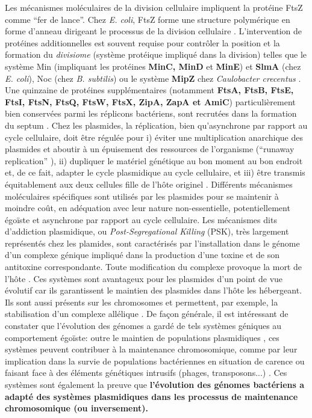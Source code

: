 	Les mécanismes moléculaires de la division cellulaire impliquent la protéine FtsZ comme “fer de lance”. Chez \textit{E. coli}, FtsZ forme une structure polymérique en forme d'anneau dirigeant le processus de la division cellulaire \citep{thanbichler2010}. L'intervention de protéines additionnelles est souvent requise pour contrôler la position et la formation du \textit{divisiome} (système protéique impliqué dans la division) telles que le système Min (impliquant les protéines \textbf{MinC, MinD} et \textbf{MinE}) et \textbf{SlmA} (chez \textit{E. coli}), Noc (chez \textit{B. subtilis}) ou le système \textbf{MipZ} chez \textit{Caulobacter crecentus} \citep{thanbichler2010synchronization}. Une quinzaine de protéines supplémentaires (notamment \textbf{FtsA, FtsB, FtsE, FtsI, FtsN, FtsQ, FtsW, FtsX, ZipA, ZapA et AmiC}) particulièrement bien conservées parmi les réplicons bactériens, sont recrutées dans la formation du septum \citep{vicente2006septum}. Chez les plasmides, la réplication, bien qu'asynchrone par rapport au cycle cellulaire, doit être régulée pour i) éviter une multiplication anarchique des plasmides et aboutir à un épuisement des ressources de l'organisme (“runaway replication” \citep{DelSolar1998}), ii) dupliquer le matériel génétique au bon moment au bon endroit et, de ce fait, adapter le cycle plasmidique au cycle cellulaire, et iii) être transmis équitablement aux deux cellules fille de l'hôte originel \citep{Pinto2012}. Différents mécanismes moléculaires spécifiques sont utilisés par les plasmides pour se maintenir à moindre coût, en adéquation avec leur nature non-essentielle, potentiellement égoïste et asynchrone par rapport au cycle cellulaire. Les mécanismes dits d'addiction plasmidique, ou \textit{Post-Segregational Killing} (PSK), très largement représentés chez les plamides, sont caractérisés par l'installation dans le génome d'un complexe génique impliqué dans la production d'une toxine et de son antitoxine correspondante. Toute modification du complexe provoque la mort de l'hôte \citep{mochizuki2006genetic}. Ces systèmes sont avantageux pour les plasmides d'un point de vue évolutif car ils garantissent le maintien des plasmides dans l'hôte les hébergeant. Ils sont aussi présents sur les chromosomes et permettent, par exemple, la stabilisation d'un complexe allélique \citep{mochizuki2006genetic}. De façon générale, il est intéressant de constater que l'évolution des génomes a gardé de tels systèmes géniques au comportement égoïste: outre le maintien de populations plasmidiques \citep{mochizuki2006genetic}, ces systèmes peuvent contribuer à la maintenance chromosomique, comme par leur implication dans la survie de populations bactériennes en situation de carence ou faisant face à des éléments génétiques intrusifs (phages, transposons...) \citep{kobayashi2004genetic}. Ces systèmes sont également la preuve que \textbf{\color{orange}l'évolution des génomes bactériens a adapté des systèmes plasmidiques dans les processus de maintenance chromosomique (ou inversement).}

